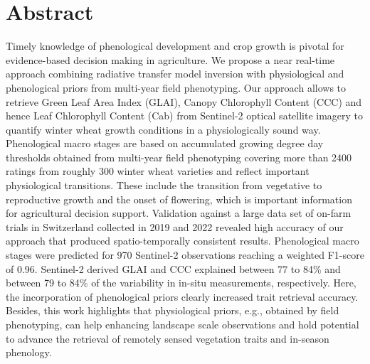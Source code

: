 \section*{Abstract}
Timely knowledge of phenological development and crop growth is pivotal for evidence-based decision making in agriculture. We propose a near real-time approach combining radiative transfer model inversion with physiological and phenological priors from multi-year field phenotyping. Our approach allows to retrieve Green Leaf Area Index (GLAI), Canopy Chlorophyll Content (CCC) and hence Leaf Chlorophyll Content (Cab) from Sentinel-2 optical satellite imagery to quantify winter wheat growth conditions in a physiologically sound way. Phenological macro stages are based on accumulated growing degree day thresholds obtained from multi-year field phenotyping covering more than 2400 ratings from roughly 300 winter wheat varieties and reflect important physiological transitions. These include the transition from vegetative to reproductive growth and the onset of flowering, which is important information for agricultural decision support. Validation against a large data set of on-farm trials in Switzerland collected in 2019 and 2022 revealed high accuracy of our approach that produced spatio-temporally consistent results. Phenological macro stages were predicted for 970 Sentinel-2 observations reaching a weighted F1-score of 0.96. Sentinel-2 derived GLAI and CCC explained between 77 to 84\% and between 79 to 84\% of the variability in in-situ measurements, respectively. Here, the incorporation of phenological priors clearly increased trait retrieval accuracy. Besides, this work highlights that physiological priors, e.g., obtained by field phenotyping, can help enhancing landscape scale observations and hold potential to advance the retrieval of remotely sensed vegetation traits and in-season phenology.

